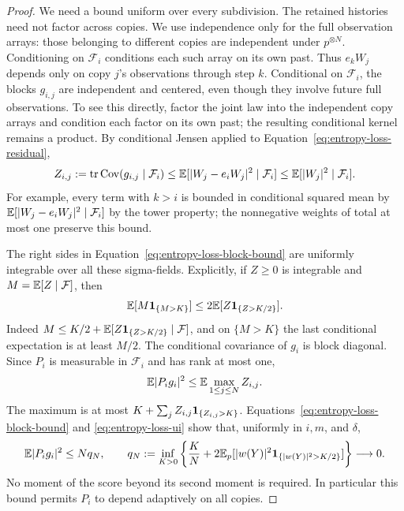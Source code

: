 \begin{proof}
We need a bound uniform over every subdivision.  The retained histories need not factor across copies.  We use
independence only for the full observation arrays: those belonging to
different copies are independent under $p^{\otimes N}$.  Conditioning
on $\mathcal F_i$ conditions each such array on its own past.  Thus
$e_kW_j$ depends only on copy $j$'s observations
through step $k$.  Conditional on $\mathcal F_i$, the blocks $g_{i,j}$
are independent and centered, even though they involve future full
observations.  To see this directly, factor the joint law into the
independent copy arrays and condition each factor on its own past;
the resulting conditional kernel remains a product.  By conditional
Jensen applied to Equation~\eqref{eq:entropy-loss-residual},
\begin{equation}
 Z_{i,j}:=\operatorname{tr}\operatorname{Cov}(g_{i,j}\mid\mathcal F_i)
 \le\mathbb E[|W_j-e_iW_j|^2\mid\mathcal F_i]
 \le\mathbb E[|W_j|^2\mid\mathcal F_i].
 \label{eq:entropy-loss-block-bound}
\end{equation}
For example, every term with $k>i$ is bounded in conditional squared
mean by $\mathbb E[|W_j-e_iW_j|^2\mid\mathcal F_i]$ by the tower property;
the nonnegative weights of total at most one preserve this bound.

The right sides in Equation~\eqref{eq:entropy-loss-block-bound} are
uniformly integrable over all these sigma-fields.  Explicitly, if
$Z\ge0$ is integrable and $M=\mathbb E[Z\mid\mathcal F]$, then
\begin{equation}
 \mathbb E[M\mathbf 1_{\{M>K\}}]\le2\mathbb E[Z\mathbf 1_{\{Z>K/2\}}].
 \label{eq:entropy-loss-ui}
\end{equation}
Indeed $M\le K/2+\mathbb E[Z\mathbf 1_{\{Z>K/2\}}\mid\mathcal F]$, and on
$\{M>K\}$ the last conditional expectation is at least $M/2$.
The conditional covariance of $g_i$ is block diagonal.  Since $P_i$
is measurable in $\mathcal F_i$ and has rank at most one,
\[
 \mathbb E|P_ig_i|^2\le\mathbb E\max_{1\le j\le N}Z_{i,j}.
\]
The maximum is at most $K+\sum_jZ_{i,j}\mathbf 1_{\{Z_{i,j}>K\}}$.
Equations~\eqref{eq:entropy-loss-block-bound} and
\eqref{eq:entropy-loss-ui} show that, uniformly in $i,m$, and $\delta$,
\begin{equation}
 \mathbb E|P_ig_i|^2\le Nq_N,\qquad
 q_N:=\inf_{K>0}\left\{\frac KN+
           2\mathbb E_p[|w(Y)|^2\mathbf 1_{\{|w(Y)|^2>K/2\}}]\right\}\longrightarrow0.
 \label{eq:entropy-loss-rank-error}
\end{equation}
No moment of the score beyond its second moment is required.  In
particular this bound permits $P_i$ to depend adaptively on all copies.


\end{proof}
